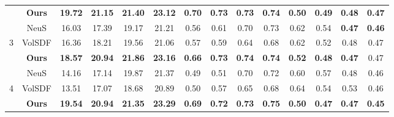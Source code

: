 \begin{table*}[h!]
\begin{center}
{\begin{tabular}{l|c|cccc|cccc|cccc}
  &\textbf{Ours}&\textcolor{textcolor}{\textbf{19.72}}&\textcolor{textcolor}{\textbf{21.15}} &\textcolor{textcolor}{\textbf{21.40}}&\textcolor{textcolor}{\textbf{23.12}}&\textcolor{textcolor}{\textbf{0.70}} &\textcolor{textcolor}{\textbf{0.73}}&\textcolor{textcolor}{\textbf{0.73}}&\textcolor{textcolor}{\textbf{0.74}}&\textcolor{textcolor}{\textbf{0.50}} &\textcolor{textcolor}{\textbf{0.49}}&\textcolor{textcolor}{\textbf{0.48}}&\textcolor{textcolor}{\textbf{0.47}}\\
\cline{0-13}
 & NeuS &16.03&17.39&19.17 &21.21&0.56&0.61&0.70&0.73&0.62   &0.54&\textcolor{textcolor}{\textbf{0.47}}&\textcolor{textcolor}{\textbf{0.46}}\\
3& VolSDF &16.36&18.21& 19.56&21.06&0.57&0.59&0.64&0.68&0.62&0.52 &0.48&0.47\\
 &\textbf{Ours}&\textcolor{textcolor}{\textbf{18.57}}&\textcolor{textcolor}{\textbf{20.94}} &\textcolor{textcolor}{\textbf{21.86}}&\textcolor{textcolor}{\textbf{23.16}}&\textcolor{textcolor}{\textbf{0.66}} &\textcolor{textcolor}{\textbf{0.73}}&\textcolor{textcolor}{\textbf{0.74}}&\textcolor{textcolor}{\textbf{0.74}}&\textcolor{textcolor}{\textbf{0.52}} &\textcolor{textcolor}{\textbf{0.48}}&\textcolor{textcolor}{\textbf{0.47}}&0.47\\
\cline{0-13}
&NeuS & 14.16&17.14 &19.87&21.37&0.49&0.51&0.70&0.72&0.60&0.57&0.48&0.46\\
4& VolSDF &13.51& 17.07 &18.68&20.89&0.50&0.57&0.65&0.68&0.64&0.54&0.53&0.46\\
 &\textbf{Ours}&\textcolor{textcolor}{\textbf{19.54}}&\textcolor{textcolor}{\textbf{20.94}} &\textcolor{textcolor}{\textbf{21.35}}&\textcolor{textcolor}{\textbf{23.29}}&\textcolor{textcolor}{\textbf{0.69}} &\textcolor{textcolor}{\textbf{0.72}}&\textcolor{textcolor}{\textbf{0.73}}&\textcolor{textcolor}{\textbf{0.75}}&\textcolor{textcolor}{\textbf{0.50}} &\textcolor{textcolor}{\textbf{0.47}}&\textcolor{textcolor}{\textbf{0.47}}&\textcolor{textcolor}{\textbf{0.45}}\\

\end{tabular}}
\end{center}
\end{table*}
